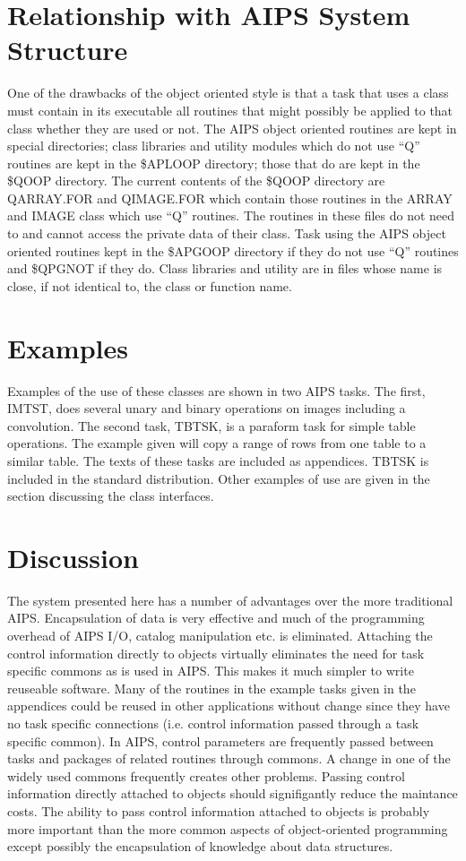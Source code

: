 \section{Relationship with AIPS System Structure}

   One of the drawbacks of the object oriented style is that a task
that uses a class must contain in its executable all routines that
might possibly be applied to that class whether they are used or not.
The AIPS  object oriented routines are kept in special directories;
class libraries and utility modules which do not use ``Q'' routines
are kept in the \$APLOOP directory; those that do are kept in the
\$QOOP directory.  The current contents of the \$QOOP directory are
QARRAY.FOR and QIMAGE.FOR which contain those routines in the ARRAY
and IMAGE class which use ``Q'' routines.  The routines in these files
do not need to and cannot access the private data of their class.
Task using the AIPS object oriented routines kept in the \$APGOOP
directory if they do not use ``Q'' routines and \$QPGNOT if they do.
Class libraries and utility are in files whose name is close, if not
identical to, the class or function name.

\section{Examples}

   Examples of the use of these classes are shown in  two AIPS tasks.
The first, IMTST, does several unary and binary
operations on images including a convolution.  The second task, TBTSK,
is a paraform task for simple table operations.  The example given
will copy a range of rows from one table to a similar table.
The texts of these tasks are included as appendices.
TBTSK is included in the standard distribution.  Other examples of use
are given in the section discussing the class interfaces.


\section{Discussion}

   The system presented here has a number of advantages over the more
traditional AIPS.  Encapsulation of data is very effective and much of
the programming overhead of AIPS I/O, catalog manipulation etc. is
eliminated.  Attaching the control information directly to objects
virtually eliminates the need for task specific commons as is used in
AIPS.  This makes it much simpler to write reuseable software.  Many
of the routines in the example tasks given in the appendices could be
reused in other applications without change since they have no task
specific connections (i.e. control information passed through a task
specific common).  In AIPS, control parameters are frequently passed
between tasks and packages of related routines through commons.  A
change in one of the widely used commons frequently creates other
problems.  Passing control information directly attached to objects
should signifigantly reduce the maintance costs.  The ability to pass
control information attached to objects is probably more important
than the more common aspects of object-oriented programming except
possibly the encapsulation of knowledge about data structures.

